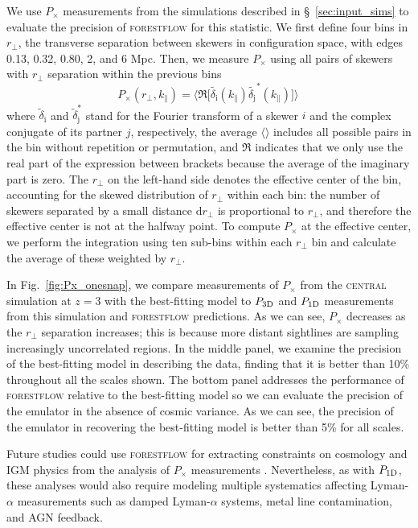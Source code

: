 \documentclass[fleqn,usenatbib]{mnras}
\newcommand{\lya}{Lyman-$\alpha$\xspace}
\newcommand{\pcross}{$P_{\times}$\xspace}
\newcommand{\poned}{\ensuremath{P_{\rm 1D}}\xspace}
\newcommand{\pthreed}{\ensuremath{P_{\rm 3D}}\xspace}
\newcommand{\forestflow}{\textsc{forestflow}\xspace}
\newcommand{\simcentral}{\textsc{central}\xspace}
\begin{document}
We use \pcross measurements from the simulations described in \S~\ref{sec:input_sims} to evaluate the precision of \forestflow for this statistic. We first define four bins in $r_\perp$, the transverse separation between skewers in configuration space, with edges 0.13, 0.32, 0.80, 2, and 6 Mpc. Then, we measure \pcross using all pairs of skewers with $r_\perp$ separation within the previous bins 
%
\begin{equation}
    P_\times(r_\perp, k_\parallel) = \bigg \langle \Re \Big[\tilde{\delta_\mathrm{i}}(k_\parallel) \tilde{\delta_\mathrm{j}}^*(k_\parallel)\Big]\bigg\rangle \,
\end{equation}
%
where $\tilde{\delta}_\mathrm{i}$ and $\tilde{\delta}^*_\mathrm{j}$ stand for the Fourier transform of a skewer $i$ and the complex conjugate of its partner $j$, respectively, the average $\langle\rangle$ includes all possible pairs in the bin without repetition or permutation, and $\Re$ indicates that we only use the real part of the expression between brackets because the average of the imaginary part is zero. The $r_\perp$ on the left-hand side denotes the effective center of the bin, accounting for the skewed distribution of $r_\perp$ within each bin: the number of skewers separated by a small distance $\mathrm{d}r_\perp$ is proportional to $r_\perp$, and therefore the effective center is not at the halfway point. To compute \pcross at the effective center, we perform the integration using ten sub-bins within each $r_\perp$ bin and calculate the average of these weighted by $r_\perp$.
    
In Fig.~\ref{fig:Px_onesnap}, we compare measurements of \pcross from the \simcentral simulation at $z=3$ with the best-fitting model to \pthreed and \poned measurements from this simulation and \forestflow predictions. As we can see, \pcross decreases as the $r_\perp$ separation increases; this is because more distant sightlines are sampling increasingly uncorrelated regions. In the middle panel, we examine the precision of the best-fitting model in describing the data, finding that it is better than 10\% throughout all the scales shown. The bottom panel addresses the performance of \forestflow relative to the best-fitting model so we can evaluate the precision of the emulator in the absence of cosmic variance. As we can see, the precision of the emulator in recovering the best-fitting model is better than 5\% for all scales.

Future studies could use \forestflow for extracting constraints on cosmology and IGM physics from the analysis of \pcross measurements \citep[e.g.;][]{Karim2023}. Nevertheless, as with \poned, these analyses would also require modeling multiple systematics affecting \lya measurements such as damped \lya systems, metal line contamination, and AGN feedback.
\end{document}
